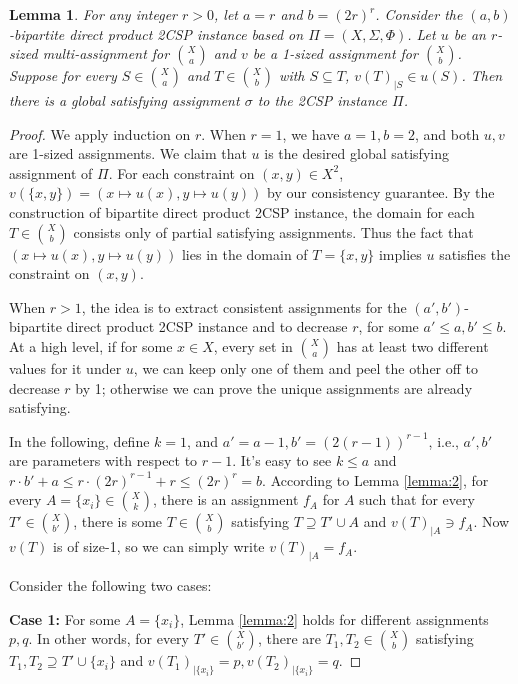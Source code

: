 \documentclass[10pt,a4paper]{article}
\newtheorem{lemma}[theorem]{Lemma}
\begin{document}
\begin{lemma}\label{lemma:3}
   For any integer $r > 0$, let $a=r$ and $b=(2r)^r$. Consider the $(a,b)$-bipartite direct product 2CSP instance based on $\Pi=(X,\Sigma,\Phi)$. Let $u$ be an $r$-sized multi-assignment for $\binom{X}{a}$ and $v$ be a 1-sized assignment for $\binom{X}{b}$. Suppose for every $S \in \binom{X}{a}$ and $T \in \binom{X}{b}$ with $S \subseteq T$, $v(T)_{|S} \in u(S)$. Then there is a global satisfying assignment $\sigma$ to the 2CSP instance $\Pi$.
\end{lemma}

\begin{proof}

We apply induction on $r$. When $r=1$, we have $a=1,b=2$, and both $u,v$ are 1-sized assignments. We claim that $u$ is the desired global satisfying assignment of $\Pi$. For each constraint on $(x,y) \in X^2$, $v(\{x,y\})=(x \mapsto u(x), y \mapsto u(y))$ by our consistency guarantee. By the construction of bipartite direct product 2CSP instance, the domain for each $T \in \binom{X}{b}$ consists only of partial satisfying assignments. Thus the fact that $(x \mapsto u(x),y \mapsto u(y))$ lies in the domain of $T=\{x,y\}$ implies $u$ satisfies the constraint on $(x,y)$.

When $r>1$, the idea is to extract consistent assignments for the $(a',b')$-bipartite direct product 2CSP instance and to decrease $r$, for some $a'\le a, b' \le b$. At a high level, if for some $x \in X$, every set in $\binom{X}{a}$ has at least two different values for it under $u$, we can keep only one of them and peel the other off to decrease $r$ by 1; otherwise we can prove the unique assignments are already satisfying.

In the following, define $k=1$, and $a'=a-1,b'=(2(r-1))^{r-1}$, i.e., $a',b'$ are parameters with respect to $r-1$. It's easy to see $k \le a$ and $r\cdot b'+a \le r\cdot (2r)^{r-1}+r \le (2r)^{r}=b$. According to Lemma \ref{lemma:2}, for every $A=\{x_i\}\in \binom{X}{k}$, there is an assignment $f_A$ for $A$ such that for every $T' \in \binom{X}{b'}$, there is some $T\in \binom{X}{b}$ satisfying $T \supseteq T' \cup A$ and $v(T)_{|A}\ni f_A$. Now $v(T)$ is of size-1, so we can simply write $v(T)_{|A}=f_A$.

Consider the following two cases:

\medskip\noindent
\textbf{Case 1:} For some $A=\{x_i\}$, Lemma \ref{lemma:2} holds for different assignments $p,q$. In other words, for every $T' \in \binom{X}{b'}$, there are $T_1,T_2 \in \binom{X}{b}$ satisfying $T_1,T_2 \supseteq T' \cup \{x_i\}$ and $v(T_1)_{|\{x_i\}}=p,v(T_2)_{|\{x_i\}}=q$. 
    

\end{proof}
\end{document}
